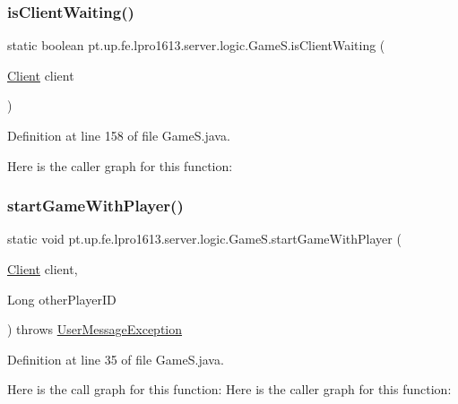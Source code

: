 \subsubsection{\texorpdfstring{is\+Client\+Waiting()}{isClientWaiting()}}
{\footnotesize\ttfamily static boolean pt.\+up.\+fe.\+lpro1613.\+server.\+logic.\+Game\+S.\+is\+Client\+Waiting (\begin{DoxyParamCaption}\item[{\hyperlink{classpt_1_1up_1_1fe_1_1lpro1613_1_1server_1_1conn_1_1_client}{Client}}]{client }\end{DoxyParamCaption})\hspace{0.3cm}{\ttfamily [static]}}



Definition at line 158 of file Game\+S.\+java.

Here is the caller graph for this function\+:
\hypertarget{classpt_1_1up_1_1fe_1_1lpro1613_1_1server_1_1logic_1_1_game_s_a19226b02188cfd19dee0992b2ce6af7a}{}\label{classpt_1_1up_1_1fe_1_1lpro1613_1_1server_1_1logic_1_1_game_s_a19226b02188cfd19dee0992b2ce6af7a} 
\subsubsection{\texorpdfstring{start\+Game\+With\+Player()}{startGameWithPlayer()}}
{\footnotesize\ttfamily static void pt.\+up.\+fe.\+lpro1613.\+server.\+logic.\+Game\+S.\+start\+Game\+With\+Player (\begin{DoxyParamCaption}\item[{\hyperlink{classpt_1_1up_1_1fe_1_1lpro1613_1_1server_1_1conn_1_1_client}{Client}}]{client,  }\item[{Long}]{other\+Player\+ID }\end{DoxyParamCaption}) throws \hyperlink{classpt_1_1up_1_1fe_1_1lpro1613_1_1sharedlib_1_1exceptions_1_1_user_message_exception}{User\+Message\+Exception}\hspace{0.3cm}{\ttfamily [static]}}



Definition at line 35 of file Game\+S.\+java.

Here is the call graph for this function\+:
Here is the caller graph for this function\+:
\hypertarget{classpt_1_1up_1_1fe_1_1lpro1613_1_1server_1_1logic_1_1_game_s_ae5c542e43792b48f5fb164730ca69bb2}{}\label{classpt_1_1up_1_1fe_1_1lpro1613_1_1server_1_1logic_1_1_game_s_ae5c542e43792b48f5fb164730ca69bb2} 

